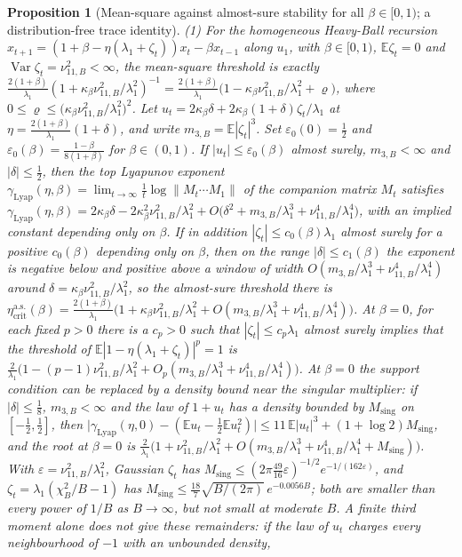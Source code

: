 \documentclass[11pt]{article}
\newtheorem{proposition}[theorem]{Proposition}
\theoremstyle{remark}
\newcommand{\etacrit}{\eta_{\mathrm{crit}}}
\newcommand{\E}{\mathbb{E}}
\newcommand{\Var}{\operatorname{Var}}
\begin{document}
\begin{proposition}[Mean-square against almost-sure stability for all $\beta\in[0,1)$; a distribution-free trace identity]\label{prop:G3}
(1) For the homogeneous Heavy-Ball recursion $x_{t+1}=(1+\beta-\eta(\lambda_1+\zeta_t))x_t-\beta x_{t-1}$ along $u_1$, with $\beta\in[0,1)$, $\E\zeta_t=0$ and $\Var\zeta_t=\nu_{11,B}^2<\infty$, the mean-square threshold is exactly $\frac{2(1+\beta)}{\lambda_1}(1+\kappa_\beta\nu_{11,B}^2/\lambda_1^2)^{-1}=\frac{2(1+\beta)}{\lambda_1}\big(1-\kappa_\beta\nu_{11,B}^2/\lambda_1^2+\varrho\big)$, where $0\le\varrho\le\big(\kappa_\beta\nu_{11,B}^2/\lambda_1^2\big)^2$. Let $u_t=2\kappa_\beta\delta+2\kappa_\beta(1+\delta)\zeta_t/\lambda_1$ at $\eta=\frac{2(1+\beta)}{\lambda_1}(1+\delta)$, and write $m_{3,B}=\E|\zeta_t|^3$. Set $\varepsilon_0(0)=\frac12$ and $\varepsilon_0(\beta)=\frac{1-\beta}{8(1+\beta)}$ for $\beta\in(0,1)$. If $|u_t|\le\varepsilon_0(\beta)$ almost surely, $m_{3,B}<\infty$ and $|\delta|\le\frac12$, then the top Lyapunov exponent $\gamma_{\mathrm{Lyap}}(\eta,\beta)=\lim_{t\to\infty}\frac1t\log\|M_t\cdots M_1\|$ of the companion matrix $M_t$ \citep{furstenberg1960products,caughey1965almost,khasminskii1967necessary,kozin1969survey,ariaratnam1979random,arnold1984formula} satisfies $\gamma_{\mathrm{Lyap}}(\eta,\beta)=2\kappa_\beta\delta-2\kappa_\beta^2\nu_{11,B}^2/\lambda_1^2+O\big(\delta^2+m_{3,B}/\lambda_1^3+\nu_{11,B}^4/\lambda_1^4\big)$, with an implied constant depending only on $\beta$. If in addition $|\zeta_t|\le c_0(\beta)\lambda_1$ almost surely for a positive $c_0(\beta)$ depending only on $\beta$, then on the range $|\delta|\le c_1(\beta)$ the exponent is negative below and positive above a window of width $O(m_{3,B}/\lambda_1^3+\nu_{11,B}^4/\lambda_1^4)$ around $\delta=\kappa_\beta\nu_{11,B}^2/\lambda_1^2$, so the almost-sure threshold there is $\etacrit^{\mathrm{a.s.}}(\beta)=\frac{2(1+\beta)}{\lambda_1}\big(1+\kappa_\beta\nu_{11,B}^2/\lambda_1^2+O(m_{3,B}/\lambda_1^3+\nu_{11,B}^4/\lambda_1^4)\big)$. At $\beta=0$, for each fixed $p>0$ there is a $c_p>0$ such that $|\zeta_t|\le c_p\lambda_1$ almost surely implies that the threshold of $\E|1-\eta(\lambda_1+\zeta_t)|^p=1$ is $\frac2{\lambda_1}\big(1-(p-1)\nu_{11,B}^2/\lambda_1^2+O_p(m_{3,B}/\lambda_1^3+\nu_{11,B}^4/\lambda_1^4)\big)$. At $\beta=0$ the support condition can be replaced by a density bound near the singular multiplier: if $|\delta|\le\frac18$, $m_{3,B}<\infty$ and the law of $1+u_t$ has a density bounded by $M_{\mathrm{sing}}$ on $[-\frac12,\frac12]$, then $\big|\gamma_{\mathrm{Lyap}}(\eta,0)-(\E u_t-\frac12\E u_t^2)\big|\le11\,\E|u_t|^3+(1+\log2)M_{\mathrm{sing}}$, and the root at $\beta=0$ is $\frac2{\lambda_1}\big(1+\nu_{11,B}^2/\lambda_1^2+O(m_{3,B}/\lambda_1^3+\nu_{11,B}^4/\lambda_1^4+M_{\mathrm{sing}})\big)$. With $\varepsilon=\nu_{11,B}^2/\lambda_1^2$, Gaussian $\zeta_t$ has $M_{\mathrm{sing}}\le(2\pi\frac{49}{16}\varepsilon)^{-1/2}e^{-1/(162\varepsilon)}$, and $\zeta_t=\lambda_1(\chi^2_B/B-1)$ has $M_{\mathrm{sing}}\le\frac{18}{7}\sqrt{B/(2\pi)}\,e^{-0.0056B}$; both are smaller than every power of $1/B$ as $B\to\infty$, but not small at moderate $B$. A finite third moment alone does not give these remainders: if the law of $u_t$ charges every neighbourhood of $-1$ with an unbounded density, 
\end{proposition}
\end{document}
